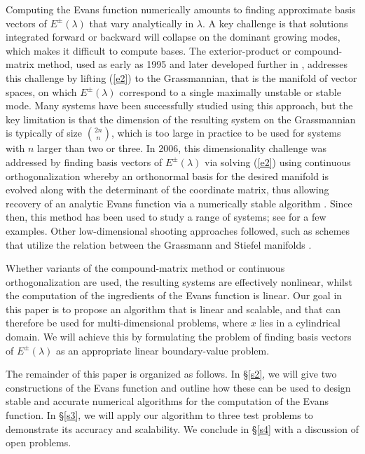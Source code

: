 \documentclass[10pt]{article}
\numberwithin{equation}{section}
\begin{document}
Computing the Evans function numerically amounts to finding approximate basis vectors of $E^\pm(\lambda)$ that vary analytically in $\lambda$. A key challenge is that solutions integrated forward or backward will collapse on the dominant growing modes, which makes it difficult to compute bases. The exterior-product or compound-matrix method, used as early as 1995 \citep{AS} and later developed further in \citep{Allen2002,BDG,Br1,Br2,BrZ}, addresses this challenge by lifting (\ref{e2}) to the Grassmannian, that is the manifold of vector spaces, on which $E^\pm(\lambda)$ correspond to a single maximally unstable or stable mode. Many systems have been successfully studied using this approach, but the key limitation is that the dimension of the resulting system on the Grassmannian is typically of size $\binom{2n}{n}$, which is too large in practice to be used for systems with $n$ larger than two or three. In 2006, this dimensionality challenge was addressed by finding basis vectors of $E^\pm(\lambda)$ via solving (\ref{e2}) using continuous orthogonalization whereby an orthonormal basis for the desired manifold is evolved along with the determinant of the coordinate matrix, thus allowing recovery of an analytic Evans function via a numerically stable algorithm \citep{HuZ2,Z5}. Since then, this method has been used to study a range of systems; see \citep{BFZ, BHLZ,BJNRZ0,BaLeZ,HLyZ1} for a few examples. Other low-dimensional shooting approaches followed, such as schemes that utilize the relation between the Grassmann and Stiefel manifolds \citep{Ledoux2009,Ledoux2010}.

Whether variants of the compound-matrix method or continuous orthogonalization are used, the resulting systems are effectively nonlinear, whilst the computation of the ingredients of the Evans function is linear. Our goal in this paper is to propose an algorithm that is linear and scalable, and that can therefore be used for multi-dimensional problems, where $x$ lies in a cylindrical domain. We will achieve this by formulating the problem of finding basis vectors of $E^\pm(\lambda)$ as an appropriate linear boundary-value problem.

The remainder of this paper is organized as follows. In \S\ref{s2}, we will give two constructions of the Evans function and outline how these can be used to design stable and accurate numerical algorithms for the computation of the Evans function. In \S\ref{s3}, we will apply our algorithm to three test problems to demonstrate its accuracy and scalability. We conclude in \S\ref{s4} with a discussion of open problems.
\end{document}
